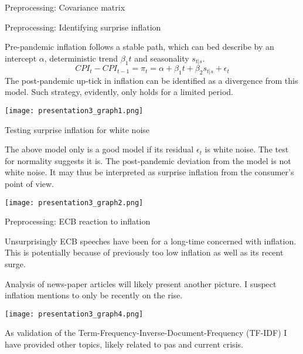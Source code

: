 \documentclass[9pt]{beamer}
\begin{document}
	\begin{frame}{Preprocessing: Covariance matrix}
	\end{frame}

	\begin{frame}{Preprocessing: Identifying surprise inflation}
	
		Pre-pandemic inflation follows a stable path, which can bed describe by an intercept $\alpha$, deterministic trend $\beta_1t$ and seasonality $s_{t|s}$.
		\[
		CPI_t - CPI_{t-1} = \pi_t = \alpha + \beta_1 t + \beta_2 	s_{t|s} + \epsilon_t
		\]
		The post-pandemic up-tick in inflation can be identified as a divergence from this model. Such strategy, evidently, only holds for a limited period.
		
		\begin{center}
			\texttt{[image: presentation3\_graph1.png]}
		\end{center}
		
	\end{frame}


	
	\begin{frame}{Testing surprise inflation for white noise}

		The above model only is a good model if its residual $\epsilon_t$ is white noise. The test for normality suggests it is.
		The post-pandemic deviation from the model is not white noise. It may thus be interpreted as surprise inflation from the consumer's point of view.
		
		\begin{center}
			\texttt{[image: presentation3\_graph2.png]}
		
		\end{center}
	
	\end{frame}
	
	\begin{frame}{Preprocessing: ECB reaction to inflation}
		
		Unsurprisingly ECB speeches have been for a long-time concerned with inflation. This is potentially because of previously too low inflation as well as its recent surge.
		
		Analysis of news-paper articles will likely present another picture. I suspect inflation mentions to only be recently on the rise.
		
		\begin{center}
			\texttt{[image: presentation3\_graph4.png]}
		\end{center}
		
		As validation of the Term-Frequency-Inverse-Document-Frequency (TF-IDF) I have provided other topics, likely related to pas and current crisis.
		
	\end{frame}
\end{document}
